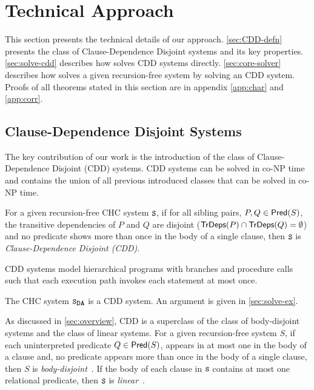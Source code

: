 \section{Technical Approach}
\label{sec:approach}
%
This section presents the technical details of our approach.
%
\autoref{sec:CDD-defn} presents the class of Clause-Dependence Disjoint
systems and its key properties.
%
\autoref{sec:solve-cdd} describes how \sys solves CDD systems
directly.
%
\autoref{sec:core-solver} describes how \sys solves a given
recursion-free system by solving an CDD system.
%
Proofs of all theorems stated in this section are in appendix
\autoref{app:char} and \autoref{app:corr}.

\subsection{Clause-Dependence Disjoint Systems}
\label{sec:CDD-defn}
%
The key contribution of our work is the introduction of the class of
Clause-Dependence Disjoint (CDD) systems.
%
CDD systems can be solved
in co-NP time and contains the union of all previous introduced classes
that can be solved in co-NP time.
%
\begin{defn}
  \label{defn:cdds}
  For a given recursion-free CHC system $\cc{S}$,
  if for all sibling pairs, $P, Q \in \mathsf{Pred}( S )$,
  the transitive dependencies of $P$ and $Q$ are disjoint ($\mathsf{TrDeps}(P) \cap
  \mathsf{TrDeps}(Q) = \emptyset$)
  and no predicate shows more than once in the body of a single clause,
  then $\cc{S}$ is \emph{Clause-Dependence Disjoint (CDD)}.
\end{defn}
%
CDD systems model hierarchical programs with branches and procedure calls such
that each execution path invokes each statement at most once.
%
\begin{ex}
  The CHC system $\mcchc$ is a CDD system. An argument is given in
  \autoref{sec:solve-ex}.
\end{ex}

As discussed in \autoref{sec:overview}, CDD is a superclass of the
class of body-disjoint systems and the class of linear systems.
%
For a given recursion-free system $S$, if each uninterpreted predicate $Q \in
\mathsf{Pred}( S )$, appears in at most one in the body of a clause and, no
predicate appears more than once in the body of a single clause,
then $S$ is \emph{body-disjoint}~\cite{rummer13a,rummer13b}.
%
If the body of each clause in $\cc{S}$ contains at most one relational
predicate, then $\cc{S}$ is \emph{linear}~\cite{albarghouthi12a}.

